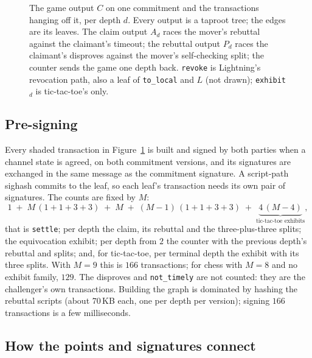 \documentclass[11pt]{article}
\begin{document}
\begin{figure}[t]
\caption{The game output $C$ on one commitment and the transactions
hanging off it, per depth $d$. Every output is a taproot tree; the
edges are its leaves. The claim output $A_d$ races the mover's
rebuttal against the claimant's timeout; the rebuttal output $P_d$
races the claimant's disproves against the mover's self-checking split;
the counter sends the game one depth back. \texttt{revoke} is
Lightning's revocation path, also a leaf of \texttt{to\_local} and $L$
(not drawn); \texttt{exhibit}$_d$ is tic-tac-toe's only.}
\label{fig:graph}
\end{figure}

\subsection{Pre-signing}
\label{sec:graph:presign}

Every shaded transaction in Figure~\ref{fig:graph} is built and signed
by both parties when a channel state is agreed, on both commitment
versions, and its signatures are exchanged in the same message as the
commitment signature. A script-path sighash commits to the leaf, so
each leaf's transaction needs its own pair of signatures. The counts
are fixed by $M$:
\[
  1 \;+\; M\,(1 + 1 + 3 + 3) \;+\; M \;+\; (M-1)\,(1 + 1 + 3 + 3)
  \;+\; \underbrace{4\,(M-4)}_{\text{tic-tac-toe exhibits}},
\]
that is \texttt{settle}; per depth the claim, its rebuttal and the
three-plus-three splits; the equivocation exhibit; per depth from $2$
the counter with the previous depth's rebuttal and splits; and, for
tic-tac-toe, per terminal depth the exhibit with its three splits. With
$M=9$ this is $166$ transactions; for chess with $M=8$ and no exhibit
family, $129$. The disproves and \texttt{not\_timely} are not counted:
they are the challenger's own transactions. Building the graph is
dominated by hashing the rebuttal scripts (about $70$\,KB each, one
per depth per version); signing $166$ transactions is a few
milliseconds.

\subsection{How the points and signatures connect}
\label{sec:graph:math}
\end{document}
